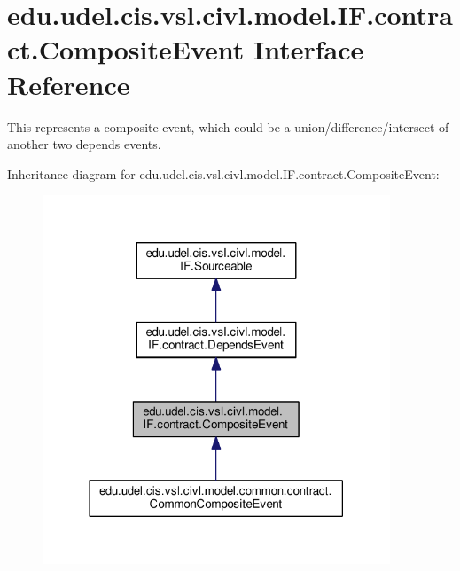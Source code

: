 \hypertarget{interfaceedu_1_1udel_1_1cis_1_1vsl_1_1civl_1_1model_1_1IF_1_1contract_1_1CompositeEvent}{}\section{edu.\+udel.\+cis.\+vsl.\+civl.\+model.\+I\+F.\+contract.\+Composite\+Event Interface Reference}
\label{interfaceedu_1_1udel_1_1cis_1_1vsl_1_1civl_1_1model_1_1IF_1_1contract_1_1CompositeEvent}


This represents a composite event, which could be a union/difference/intersect of another two depends events.  




Inheritance diagram for edu.\+udel.\+cis.\+vsl.\+civl.\+model.\+I\+F.\+contract.\+Composite\+Event\+:
\nopagebreak
\begin{figure}[H]
\begin{center}
\leavevmode
\includegraphics[width=294pt]{interfaceedu_1_1udel_1_1cis_1_1vsl_1_1civl_1_1model_1_1IF_1_1contract_1_1CompositeEvent__inherit__graph}
\end{center}
\end{figure}


